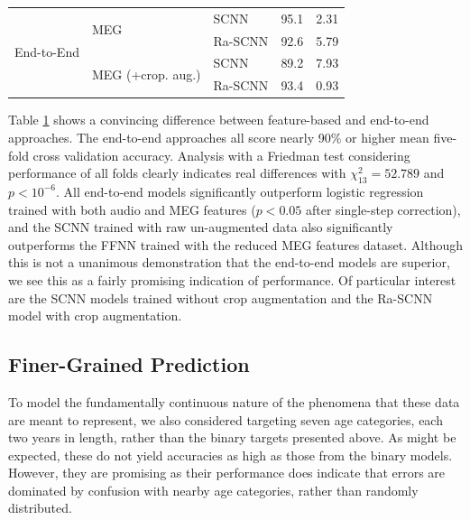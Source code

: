 \documentclass[fleqn,10pt]{wlscirep}
\begin{document}
\begin{table}[htp]
\begin{tabular}{l | l  l | c | c }
    \midrule
    \multirow{4}{*}{End-to-End}     & \multirow{2}{*}{MEG}   & SCNN                   & 95.1 & 2.31  \\
                                    &                        & Ra-SCNN                & 92.6 & 5.79  \\     
    \cline{2-5}
                                    & \multirow{2}{*}{MEG (+crop. aug.)}  & SCNN      & 89.2 & 7.93  \\
                                    &                        & Ra-SCNN                & 93.4 & 0.93  \\         
    \bottomrule
  \end{tabular}
  \label{tab:binary_results}
\end{table}

Table \ref{tab:binary_results} shows a convincing difference between feature-based and end-to-end approaches. The end-to-end approaches all score nearly 90\% or higher mean five-fold cross validation accuracy. Analysis with a Friedman test considering performance of all folds clearly indicates real differences with $\chi^2_{13}=52.789$ and $p<10^{-6}$. All end-to-end models significantly outperform logistic regression trained with both audio and MEG features ($p<0.05$ after single-step correction), and the SCNN trained with raw un-augmented data also significantly outperforms the FFNN trained with the reduced MEG features dataset. Although this is not a unanimous demonstration that the end-to-end models are superior, we see this as a fairly promising indication of performance. Of particular interest are the SCNN models trained without crop augmentation and the Ra-SCNN model with crop augmentation.

\subsection*{Finer-Grained Prediction}

To model the fundamentally continuous nature of the phenomena that these data are meant to represent, we also considered targeting seven age categories, each two years in length, rather than the binary targets presented above. As might be expected, these do not yield accuracies as high as those from the binary models. However,  they are promising as their performance does indicate that errors are dominated by confusion with nearby age categories, rather than randomly distributed.
\end{document}
